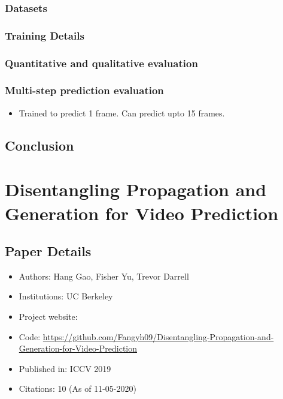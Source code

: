 \documentclass{article}
\begin{document}
    \subsubsection{Datasets}\label{subsubsec:Predicting_Future_Frames_using_Retrospective_Cycle_GAN:datasets}

    \subsubsection{Training Details}\label{subsubsec:Predicting_Future_Frames_using_Retrospective_Cycle_GAN:training-details}

    \subsubsection{Quantitative and qualitative evaluation}\label{subsubsec:Predicting_Future_Frames_using_Retrospective_Cycle_GAN:quantitative-and-qualitative-evaluation}

    \subsubsection{Multi-step prediction evaluation}\label{subsubsec:Predicting_Future_Frames_using_Retrospective_Cycle_GAN:multi-step-prediction-evaluation}
    \begin{itemize}
        \item Trained to predict 1 frame.
        Can predict upto 15 frames.
    \end{itemize}

    \subsection{Conclusion}\label{subsec:Predicting_Future_Frames_using_Retrospective_Cycle_GAN:conclusion}
    \newpage


    \section{Disentangling Propagation and Generation for Video Prediction}\label{sec:Disentangling_Propagation_and_Generation_for_Video_Prediction}
    \subsection*{Paper Details}
    \begin{itemize}
        \item Authors: Hang Gao, Fisher Yu, Trevor Darrell
        \item Institutions: UC Berkeley
        \item Project website:
        \item Code: \url{https://github.com/Fangyh09/Disentangling-Propagation-and-Generation-for-Video-Prediction}
        \item Published in: ICCV 2019
        \item Citations: 10 (As of 11-05-2020)
    \end{itemize}
\end{document}
